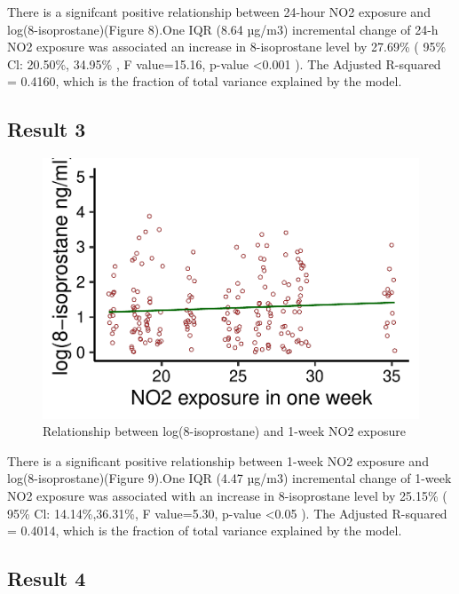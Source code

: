 \documentclass[12pt,]{article}
\begin{document}
There is a signifcant positive relationship between 24-hour NO2 exposure
and log(8-isoprostane)(Figure 8).One IQR (8.64 µg/m3) incremental change
of 24-h NO2 exposure was associated an increase in 8-isoprostane level
by 27.69\% ( 95\% Cl: 20.50\%, 34.95\% , F value=15.16, p-value
\textless0.001 ). The Adjusted R-squared = 0.4160, which is the fraction
of total variance explained by the model.

\hypertarget{result-3}{%
\subsection{Result 3}\label{result-3}}

\begin{figure}
\centering
\includegraphics{Wang_ENV872_Project_files/figure-latex/unnamed-chunk-12-1.pdf}
\caption{Relationship between log(8-isoprostane) and 1-week NO2
exposure}
\end{figure}

There is a significant positive relationship between 1-week NO2 exposure
and log(8-isoprostane)(Figure 9).One IQR (4.47 µg/m3) incremental change
of 1-week NO2 exposure was associated with an increase in 8-isoprostane
level by 25.15\% ( 95\% Cl: 14.14\%,36.31\%, F value=5.30, p-value
\textless0.05 ). The Adjusted R-squared = 0.4014, which is the fraction
of total variance explained by the model.

\hypertarget{result-4}{%
\subsection{Result 4}\label{result-4}}
\end{document}
